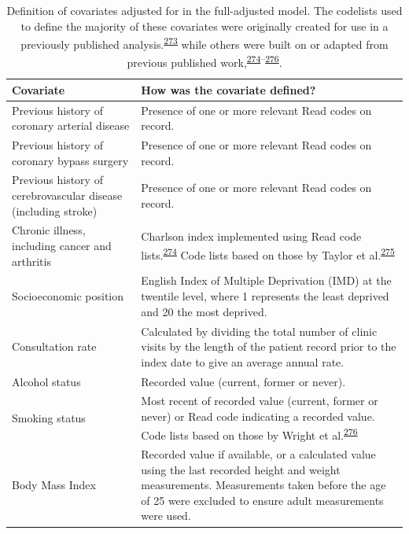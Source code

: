 \documentclass[a4paper, twoside]{templates/ociamthesis}
\begin{document}
\begin{table}[H]

\caption[Covariates adjusted for.]{\label{tab:covariateDef-table}Definition of covariates adjusted for in the full-adjusted model. The codelists used to define the majority of these covariates were originally created for use in a previously published analysis.\textsuperscript{\protect\hyperlink{ref-walker2020}{273}} while others were built on or adapted from previous published work,\textsuperscript{\protect\hyperlink{ref-khan2010}{274}--\protect\hyperlink{ref-wright2017}{276}}.}
\centering
\fontsize{9}{11}\selectfont
\begin{tabular}[t]{>{\raggedright\arraybackslash}p{15em}>{\centering\arraybackslash}p{25em}}
\toprule
\textbf{Covariate } & \textbf{How was the covariate defined?}\\
\midrule
Previous history of coronary arterial disease & Presence of one or more relevant Read codes on record.\\
\midrule
Previous history of coronary bypass surgery & Presence of one or more relevant Read codes on record.\\
\midrule
Previous history of cerebrovascular disease (including stroke) & Presence of one or more relevant Read codes on record.\\
\midrule
Chronic illness, including cancer and arthritis & Charlson index implemented using Read code lists.\textsuperscript{\protect\hyperlink{ref-khan2010}{274}} Code lists based on those by Taylor et al.\textsuperscript{\protect\hyperlink{ref-taylor2016}{275}}\\
\midrule
Socioeconomic position & 2010 English Index of Multiple Deprivation (IMD) at the twentile level, where 1 represents the least deprived and 20 the most deprived.\\
\midrule
\addlinespace
Consultation rate & Calculated by dividing the total number of clinic visits by the length of the patient record prior to the index date to give an average annual rate.\\
\midrule
Alcohol status & Recorded value (current, former or never).\\
\midrule
Smoking status & Most recent of recorded value (current, former or never) or Read code indicating a recorded value. Code lists based on those by Wright et al.\textsuperscript{\protect\hyperlink{ref-wright2017}{276}}\\
\midrule
Body Mass Index & Recorded value if available, or a calculated value using the last recorded height and weight measurements. Measurements taken before the age of 25 were excluded to ensure adult measurements were used.\\

\end{tabular}
\end{table}
\end{document}
